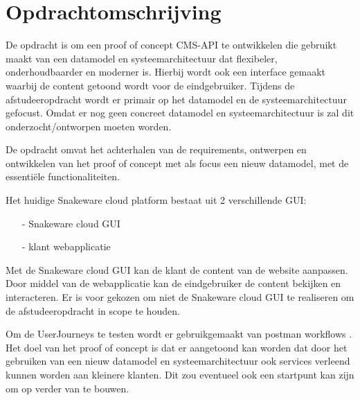 \section{Opdrachtomschrijving}
\label{sec:Opdrachtomschrijving}
De opdracht is om een proof of concept CMS-API te ontwikkelen die gebruikt maakt van een datamodel en systeemarchitectuur dat flexibeler, onderhoudbaarder en moderner is.
Hierbij wordt ook een interface gemaakt waarbij de content getoond wordt voor de eindgebruiker.
Tijdens de afstudeeropdracht wordt er primair op het datamodel en de systeemarchitectuur gefocust.
Omdat er nog geen concreet datamodel en systeemarchitectuur is zal dit onderzocht/ontworpen moeten worden.

\whitespace[2]
De opdracht omvat het achterhalen van de requirements, ontwerpen en ontwikkelen van het proof of concept met als focus een nieuw datamodel, met de essentiële functionaliteiten.

\whitespace[2]
Het huidige Snakeware cloud platform bestaat uit 2 verschillende \gls{GUI}: 
\begin{itemize}
    \item[-] Snakeware cloud \gls{GUI}  
    \item[-] klant webapplicatie
\end{itemize}

\whitespace
Met de Snakeware cloud \gls{GUI} kan de klant de content van de website aanpassen.
Door middel van de webapplicatie kan de eindgebruiker de content bekijken en interacteren.
Er is voor gekozen om niet de Snakeware cloud \gls{GUI} te realiseren om de afstudeeropdracht in scope te houden.

\whitespace[2]
Om de \gls{UserJourneys} te testen wordt er gebruikgemaakt van postman workflows \Parencite{PostmanWorkflows}.
Het doel van het proof of concept is dat er aangetoond kan worden dat door het gebruiken van een nieuw datamodel en systeemarchitectuur ook services verleend kunnen worden aan kleinere klanten.
Dit zou eventueel ook een startpunt kan zijn om op verder van te bouwen.

